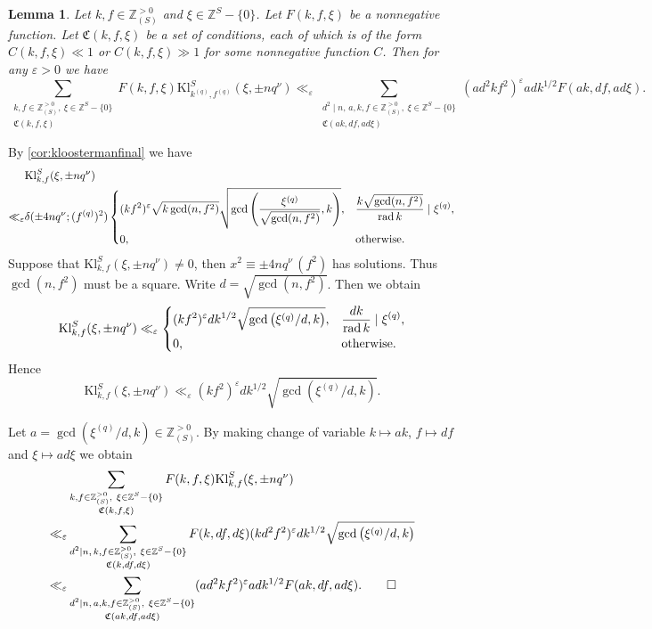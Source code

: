 \documentclass[10pt,oneside,reqno]{amsart}
\makeatletter
\newcommand\ZZ{\mathbb{Z}}
\newcommand\mf[1]{\mathfrak{#1}}
\DeclareMathOperator\rad{rad}
\newcommand\Kl{\mathrm{Kl}}
\theoremstyle{THEOREM}
\newtheorem{lemma}[theorem]{Lemma}
\theoremstyle{DEFINITION}
\theoremstyle{EXERCISE}
\numberwithin{equation}{section}
\renewenvironment{proof}[1][\proofname]{\par
  \vspace{-6pt}
  \pushQED{\qed}
  \normalfont \topsep6\p@\@plus6\p@\relax
  \trivlist
  \item[\hskip\labelsep\rmfamily\bfseries
    #1\@addpunct{:}]\ignorespaces
}{
  \popQED\endtrivlist\@endpefalse
  \vspace{-6pt}
}
\makeatother
\begin{document}
\begin{lemma}\label{lem:kloosterman}
Let $k,f\in \ZZ_{(S)}^{>0}$ and $\xi\in \ZZ^S-\{0\}$. Let $F(k,f,\xi)$ be a nonnegative function. Let $\mf{C}(k,f,\xi)$ be a set of conditions, each of which is of the form $C(k,f,\xi)\ll 1$ or $C(k,f,\xi)\gg 1$ for some nonnegative function $C$. Then for any $\varepsilon>0$ we have
\[
\sum_{\substack{k,f\in \ZZ_{(S)}^{>0},\ \xi\in \ZZ^S-\{0\}\\\mf{C}(k,f,\xi)}}F(k,f,\xi)\Kl_{k^{(q)},f^{(q)}}^S(\xi,\pm nq^\nu)\ll_\varepsilon \sum_{\substack{d^2\mid n,\, a,k,f\in \ZZ_{(S)}^{>0},\ \xi\in \ZZ^S-\{0\}\\\mf{C}(ak,df,ad\xi)}}(ad^2kf^2)^\varepsilon adk^{1/2}F(ak,df,ad\xi).
\]
\end{lemma}
\begin{proof}
By \autoref{cor:kloostermanfinal} we have
\begin{align*}
    & \Kl_{k,f}^S(\xi,\pm nq^\nu)  \\
   \ll_{\varepsilon}  &  \delta(\pm4nq^\nu;(f^{(q)})^2)\begin{dcases}
             (kf^2)^\varepsilon\sqrt{k\gcd(n,f^2)}\sqrt{\gcd\left( \frac{\xi^{(q)}}{\sqrt{\gcd(n,f^2)}},k\right)}, & \frac{k\sqrt{\gcd(n,f^2)}}{\rad k}\mid \xi^{(q)},  \\
              0, & \text{otherwise}.
            \end{dcases}
\end{align*}
Suppose that $\Kl_{k,f}^S(\xi,\pm nq^\nu)\neq 0$, then $x^2\equiv \pm 4nq^\nu\, (f^2)$ has solutions. Thus $\gcd(n,f^2)$ must be a square. Write $d=\sqrt{\gcd(n,f^2)}$. Then we obtain
\[
     \Kl_{k,f}^S(\xi,\pm nq^\nu)  
   \ll_\varepsilon   \begin{dcases}
             (kf^2)^\varepsilon   dk^{1/2}\sqrt{\gcd\left(\xi^{(q)}/d,k\right)}, & \frac{dk}{\rad k}\mid \xi^{(q)},  \\
              0, & \text{otherwise}.
            \end{dcases}
\]
Hence 
\[
\Kl_{k,f}^S(\xi,\pm nq^\nu) \ll_\varepsilon (kf^2)^\varepsilon dk^{1/2}\sqrt{\gcd\left(\xi^{(q)}/d,k\right)}.
\]

Let $a=\gcd(\xi^{(q)}/d,k)\in \ZZ_{(S)}^{>0}$. By making change of variable $k\mapsto ak$, $f\mapsto df$ and $\xi\mapsto ad\xi$ we obtain
\begin{align*}
     &\sum_{\substack{k,f\in \ZZ_{(S)}^{>0},\ \xi\in \ZZ^S-\{0\} \\\mf{C}(k,f,\xi)}}F(k,f,\xi)\Kl_{k,f}^S(\xi,\pm nq^\nu) \\   
   \ll_\varepsilon & \sum_{\substack{d^2\mid n,\,k,f\in \ZZ_{(S)}^{>0},\ \xi\in \ZZ^S-\{0\} \\ \mf{C}(k,df,d\xi)}}F(k,df,d\xi)(kd^2f^2)^\varepsilon dk^{1/2}\sqrt{\gcd\left(\xi^{(q)}/d,k\right)} \\
   \ll_\varepsilon  & \sum_{\substack{d^2\mid n,\,a,k,f\in \ZZ_{(S)}^{>0},\ \xi\in \ZZ^S-\{0\}\\\mf{C}(ak,df,ad\xi)}}(ad^2kf^2)^\varepsilon adk^{1/2}F(ak,df,ad\xi).\qedhere
\end{align*}
\end{proof}
\end{document}
